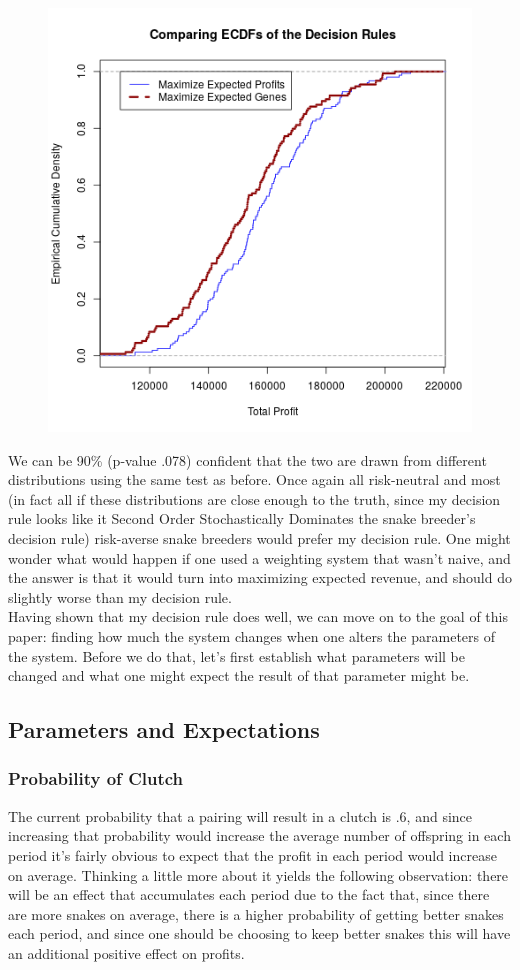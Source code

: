 \documentclass{article}
\begin{document}
	\begin{figure}[H]
	\centering
	\includegraphics[width=.75\textwidth]{newECDF.png}
	\end{figure}
	
	We can be 90\% (p-value .078) confident that the two are drawn from different distributions using the same test as before. Once again all risk-neutral and most (in fact all if these distributions are close enough to the truth, since my decision rule looks like it Second Order Stochastically Dominates the snake breeder's decision rule) risk-averse snake breeders  would prefer my decision rule. One might wonder what would happen if one used a weighting system that wasn't naive, and the answer is that it would turn into maximizing expected revenue, and should do slightly worse than my decision rule.\\
	\indent Having shown that my decision rule does well, we can move on to the goal of this paper: finding how much the system changes when one alters the parameters of the system. Before we do that, let's first establish what parameters will be changed and what one might expect the result of that parameter might be.
	\subsection*{Parameters and Expectations}
		\subsubsection*{Probability of Clutch}
		\indent The current probability that a pairing will result in a clutch is .6, and since increasing that probability would increase the average number of offspring in each period it's fairly obvious to expect that the profit in each period would increase on average. Thinking a little more about it yields the following observation: there will be an effect that accumulates each period due to the fact that, since there are more snakes on average, there is a higher probability of getting better snakes each period, and since one should be choosing to keep better snakes this will have an additional positive effect on profits.
\end{document}
